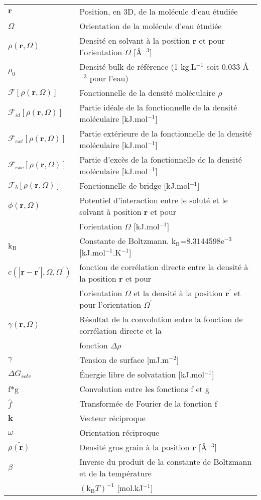 \documentclass{bredele}
\begin{document}
\begin{tabular}{ l l }
$\boldsymbol{r}$ & Position, en 3D, de la molécule d'eau étudiée \\
$\Omega$ & Orientation de la molécule d'eau étudiée \\
$\rho\left(\boldsymbol{r},\Omega \right)$ & Densité en solvant à la position $\boldsymbol{r}$ et pour l'orientation $\Omega$ [\AA$^{-3}$]  \\  
$\rho_0$ & Densité bulk de référence (1 kg.L$^{-1}$ soit 0.033 \AA$^{-3}$ pour l'eau) \\
$\mathcal{F}[\rho\left(\boldsymbol{r},\Omega \right)]$ & Fonctionnelle de la densité moléculaire $\rho$ \\
$\mathcal{F}_{id}[\rho\left(\boldsymbol{r},\Omega \right)]$ & Partie idéale de la fonctionnelle de la densité moléculaire [kJ.mol$^{-1}$]\\
$\mathcal{F}_{ext}[\rho\left(\boldsymbol{r},\Omega \right)]$ & Partie extérieure de la fonctionnelle de la densité moléculaire  [kJ.mol$^{-1}$]\\
$\mathcal{F}_{exc}[\rho\left(\boldsymbol{r},\Omega \right)]$ & Partie d'excès de la fonctionnelle de la densité moléculaire [kJ.mol$^{-1}$]\\
$\mathcal{F}_{b}[\rho\left(\boldsymbol{r},\Omega \right)]$ & Fonctionnelle de bridge [kJ.mol$^{-1}$]\\
$\phi\left(\boldsymbol{r},\Omega \right)$ & Potentiel d'interaction entre le soluté et le solvant à position $\boldsymbol{r}$ et pour \\
 & l'orientation $\Omega$ [kJ.mol$^{-1}$]\\
$\mathrm{k_B}$ & Constante de Boltzmann. $\mathrm{k_B}$=8.3144598e$^{-3}$ [kJ.mol$^{-1}$.K$^{-1}$]\\
$c\left(\left|\boldsymbol{r}-\boldsymbol{r}^\prime\right|,\Omega,\Omega^\prime \right)$ & fonction de corrélation directe entre la densité à la position $\boldsymbol{r}$ et pour \\
 & l'orientation $\Omega$ et la densité à la position $\boldsymbol{r}^\prime$ et pour l'orientation $\Omega^\prime$\\
$\gamma(\boldsymbol{r},\Omega)$ & Résultat de la convolution entre la  fonction de corrélation directe et la\\
& fonction $\Delta\rho$\\
$\gamma$ & Tension de surface [mJ.m$^{-2}$]\\
$\Delta G_{solv}$ & \'Energie libre de solvatation [kJ.mol$^{-1}$]\\
f$\ast$g & Convolution entre les fonctions f et g\\
$\hat{f}$ & Transformée de Fourier de la fonction f\\
$\boldsymbol{k}$ & Vecteur réciproque\\
$\omega$ & Orientation réciproque \\
$\bar{\rho(\boldsymbol{r})}$ & Densité gros grain à la position $\boldsymbol{r}$ [\AA$^{-3}$] \\
$\beta$ & Inverse du produit de la constante de Boltzmann et de la température \\
 & $(\mathrm{k_B}T)^{-1}$ [mol.kJ$^{-1}$]\\
\end{tabular}
\end{document}
